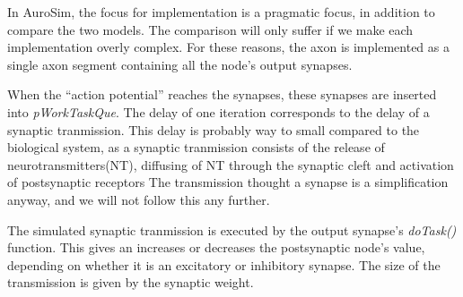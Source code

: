 	In AuroSim, the focus for implementation is a pragmatic focus, in addition to compare the two models. 
	The comparison will only suffer if we make each implementation overly complex.
	For these reasons, the axon is implemented as a single axon segment containing all the node's output synapses.

	When the ``action potential'' reaches the synapses, these synapses are inserted into \emph{pWorkTaskQue}.
	The delay of one iteration corresponds to the delay of a synaptic tranmission.
	This delay is probably way to small compared to the biological system, as a synaptic tranmission consists of the release of neurotransmitters(NT), 
		diffusing of NT through the synaptic cleft and activation of postsynaptic receptors\cite{PurvesNeuroscienceKAP05}
	The transmission thought a synapse is a simplification anyway, and we will not follow this any further. %

	
	The simulated synaptic tranmission is executed by the output synapse's \emph{doTask()} function.
	This gives an increases or decreases the postsynaptic node's value, depending on whether it is an excitatory or inhibitory synapse.
	The size of the transmission is given by the synaptic weight.

